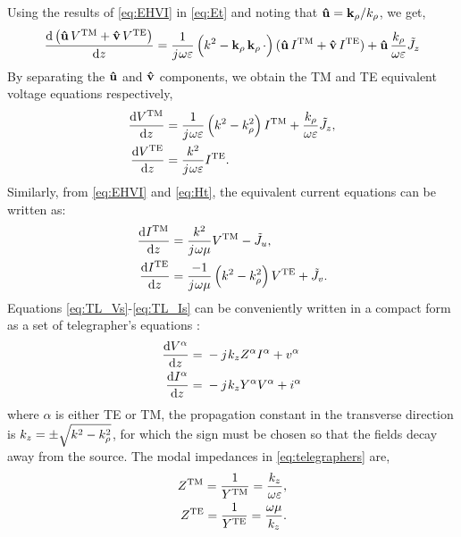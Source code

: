 %
Using the results of \eqref{eq:EHVI} in \eqref{eq:Et} and noting that $\mathbf{\hat u} = \mathbf{k}_{\rho}/k_{\rho}$, we get,
%
\begin{equation}
  \dv{\left(\mathbf{\hat u} \, V^{\mathrm{TM}} + \mathbf{\hat v} \,V^{\mathrm{TE}} \right)}{z} = \frac{1}{{j}\mkern1mu \omega \varepsilon}\left( k^2 - \mathbf{k}_{\rho} \,\mathbf{k}_{\rho}
  \,\cdot \right) (\mathbf{\hat u}\, I^{\mathrm{TM}} +
  \mathbf{\hat v} \, I^{\mathrm{TE}}) + \mathbf{\hat u} \, \frac{k_{\rho}}{\omega \varepsilon} \tilde{J}_z
  \label{eq:Vinuv}
\end{equation}
%
By separating the $\mathbf{\hat u}$ and $\mathbf{\hat v}$ components, we obtain the TM and TE equivalent voltage equations respectively,
%
\begin{subequations}
  \begin{align}
    \dv{V^{\mathrm{TM}}}{z} ={}&
    \frac{1}{{j}\mkern1mu \omega \varepsilon}\left( k^2 - k_{\rho}^2 \right)I^{\mathrm{TM}} + \frac{k_{\rho}}{\omega \varepsilon} \tilde{J}_z,
    \label{eq:V_TM}\\
    \dv{V^{\mathrm{TE}}}{z} ={}&
    \frac{k^2}{{j}\mkern1mu \omega \varepsilon} I^{\mathrm{TE}}.
    \label{eq:V_TE}
  \end{align}
  \label{eq:TL_Vs}%
\end{subequations}
%
Similarly, from \eqref{eq:EHVI} and \eqref{eq:Ht}, the equivalent current equations can be written as:
%
\begin{subequations}
  \begin{align}
    \dv{I^{\mathrm{TM}}}{z} ={}&
    \frac{k^2}{{j}\mkern1mu \omega \mu} V^{\mathrm{TM}} - \tilde{J}_u,
    \label{eq:I_TM}\\
    \dv{I^{\mathrm{TE}}}{z} ={}&
    \frac{-1}{{j}\mkern1mu \omega \mu}\left( k^2 - k_{\rho}^2 \right)V^{\mathrm{TE}} + \tilde{J}_v.
    \label{eq:I_TE}
  \end{align}
  \label{eq:TL_Is}%
\end{subequations}
%
Equations \eqref{eq:TL_Vs}-\eqref{eq:TL_Is} can be conveniently written in a compact form as a set of telegrapher's equations \cite[p. 190]{Felsen1994}:
%
\begin{subequations}
  \begin{align}
    \dv{V^{\alpha}}{z} ={}& -{j}\mkern1mu k_z Z^{\alpha}I^{\alpha} + v^{\alpha}
    \label{eq:TL_finalV}\\
    \dv{I^{\alpha}}{z} ={}& -{j}\mkern1mu k_z Y^{\alpha}V^{\alpha} + i^{\alpha}
    \label{eq:TL_finalI}
  \end{align}
  \label{eq:telegraphers}%
\end{subequations}
%
where $\alpha$ is either TE or TM, the propagation constant in the transverse direction is $k_z = \pm \sqrt{k^2 - k_{\rho}^2}$, for which the sign must be chosen so that the fields decay away from the source. The modal impedances in \eqref{eq:telegraphers} are,
%
\begin{subequations}
  \begin{align}
    Z^{\mathrm{TM}} = \frac{1}{Y^{\mathrm{TM}}} = \frac{k_z}{\omega \varepsilon},
    \label{eq:z_TM}\\
    Z^{\mathrm{TE}} = \frac{1}{Y^{\mathrm{TE}}} = \frac{\omega \mu}{k_z}.
    \label{eq:z_TE}
  \end{align}
  \label{eq:Z}%
\end{subequations}
%

